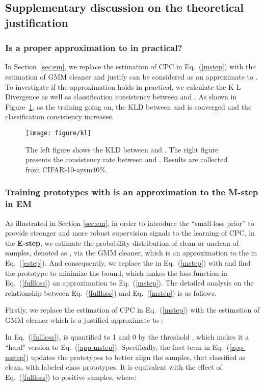 \documentclass{article} \usepackage{iclr2023_conference,times}
\begin{document}
\subsection{Supplementary discussion on the theoretical justification}
\label{app:kl}
\subsubsection{Is  a proper approximation to  in practical?} 
In Section~\ref{sec:em}, we replace the estimation of CPC  in Eq.~(\ref{mstep}) with the estimation of GMM cleaner  and justify  can be considered as an approximate to . To investigate if the approximation holds in practical, we calculate the K-L Divergence as well as classification consistency between  and . As shown in Figure~\ref{fig:kl}, as the training going on, the KLD  between  and  is converged and the classification consistency increases. 
\begin{figure}[t]
\centering
  \texttt{[image: figure/kl]}
    \vspace{-2\baselineskip}
  \caption{ The left figure shows the KLD between  and . The right figure presents the consistency rate between  and . Results are collected from CIFAR-10-aysm40\%. }
\label{fig:kl}
\end{figure}

\subsubsection{Training prototypes with \texttt{} is an approximation to the M-step in EM} \label{app:loss}
As illustrated in Section \ref{sec:em},  in order to introduce the ``small-loss prior'' to provide stronger and more robust supervision signals to the learning of CPC, in the \textbf{E-step}, we estimate the probability distribution of clean or unclean of samples, denoted as , via the GMM cleaner, which is an approximation to the  in Eq.~(\ref{estep}). And consequently, we replace the  in  Eq.~(\ref{mstep}) with  and find the prototype  to minimize the bound, which makes the loss function  in Eq.~(\ref{fullloss}) an approximation to Eq.~(\ref{mstep}). The detailed analysis on the relationship between Eq.~(\ref{fullloss}) and Eq.~(\ref{mstep}) is as follows.

Firstly, we replace the estimation of CPC  in Eq.~(\ref{mstep}) with the estimation of GMM cleaner  which is a justified approximate to :

 In Eq.~(\ref{fullloss}),  is quantified to 1 and 0 by the threshold , which makes it a ``hard" version to  Eq.~(\ref{app-mstep}). Specifically, the first term in Eq.~(\ref{app-mstep}) updates the prototypes  to better align the samples, that classified as clean, with labeled class prototypes. It is equivalent with the effect of Eq.~(\ref{fullloss}) to positive samples, where:
 
\end{document}
